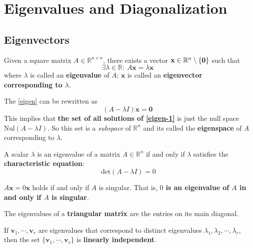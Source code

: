 \section{Eigenvalues and Diagonalization}
\subsection{Eigenvectors}
\begin{Def}
    Given a square matrix $A\in\mathbb{R}^{n\times n}$, there exists a vector $\mathbf{x}\in \mathbb{R}^n \setminus \{\mathbf{0}\}$ such that
    \begin{equation} \label{eigen}
        \exists \lambda \in \mathbb{R}:\ A\mathbf{x} = \lambda\mathbf{x}
    \end{equation}
    where $\lambda$ is called an \textbf{eigenvalue} of $A$; $\mathbf{x}$ is called an \textbf{eigenvector corresponding to $\lambda$}.
\end{Def}

\noindent 
    The \cref{eigen} can be rewritten as
    \begin{equation} \label{eigen-1}
        (A - \lambda I)\mathbf{x} = \mathbf{0}
    \end{equation}
This implies that \textbf{the set of all solutions of \cref{eigen-1}} is just the null space $\text{Nul}(A - \lambda I)$. So this set is a \textit{subspace} of $\mathbb{R}^n$ and its called the \textbf{eigenspace} of $A$ corresponding to $\lambda$.

\begin{Def}
    A scalar $\lambda$ is an eigenvalue of a matrix $A\in\mathbb{R}^n$ if and only if $\lambda$ satisfies the \textbf{characteristic equation}:
    \begin{equation}\
        \text{det}(A - \lambda I) = 0
    \end{equation}
\end{Def}

\begin{Rem}
    $A\mathbf{x} = 0\mathbf{x}$ holds if and only if $A$ is singular. That is, \textbf{$0$ is an eigenvalue of $A$ in and only if $A$ is singular}.
\end{Rem}

\begin{Thm}
    The eigenvalues of a \textbf{triangular matrix} are the entries on its main diagonal.
\end{Thm}

\begin{Thm}
    If $\mathbf{v}_1, \cdots, \mathbf{v}_r$ are eigenvalues that correspond to distinct eigenvalues $\lambda_1, \lambda_2, \cdots, \lambda_r$, then the set $\{\mathbf{v}_1, \cdots, \mathbf{v}_r \}$ is 
    \textbf{linearly independent}.
\end{Thm}


